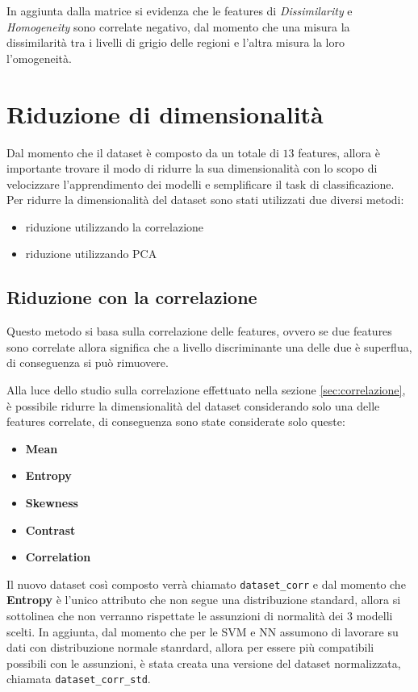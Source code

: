 In aggiunta dalla matrice si evidenza che le features di \textit{Dissimilarity}
e \textit{Homogeneity} sono correlate negativo, dal momento che una misura la
dissimilarità tra i livelli di grigio delle regioni e l'altra misura la loro
l'omogeneità.

\section{Riduzione di dimensionalità} \label{sec:riduzone_di_dimensionalità}
Dal momento che il dataset è composto da un totale di $13$ features, allora
è importante trovare il modo di ridurre la sua dimensionalità con lo scopo di
velocizzare l'apprendimento dei modelli e semplificare il task di classificazione.
Per ridurre la dimensionalità del dataset sono stati utilizzati due diversi metodi:
\begin{itemize}
      \item riduzione utilizzando la correlazione
      \item riduzione utilizzando PCA
\end{itemize}

\subsection{Riduzione con la correlazione} \label{sec:riduzione_correlazione}
Questo metodo si basa sulla correlazione delle features, ovvero se due features
sono correlate allora significa che a livello discriminante una delle due è superflua,
di conseguenza si può rimuovere.

Alla luce dello studio sulla correlazione effettuato nella sezione \ref{sec:correlazione},
è possibile ridurre la dimensionalità del dataset considerando solo una delle
features correlate, di conseguenza sono state considerate solo queste:
\begin{itemize}
      \item \textbf{Mean}
      \item \textbf{Entropy}
      \item \textbf{Skewness}
      \item \textbf{Contrast}
      \item \textbf{Correlation}
\end{itemize}
Il nuovo dataset così composto verrà chiamato \texttt{dataset\_corr} e dal momento
che \textbf{Entropy} è l'unico attributo che non segue una distribuzione standard,
allora si sottolinea che non verranno rispettate le assunzioni di normalità dei
$3$ modelli scelti. In aggiunta, dal momento che per le SVM e NN assumono di
lavorare su dati con distribuzione normale stanrdard, allora per essere più
compatibili possibili con le assunzioni, è stata creata una versione del dataset
normalizzata, chiamata \texttt{dataset\_corr\_std}. 


